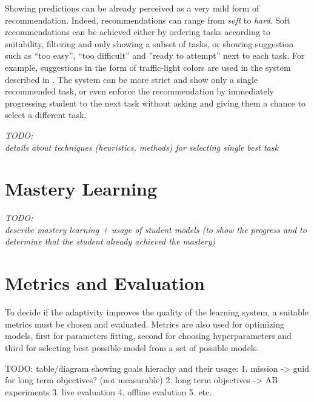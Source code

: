 Showing predictions can be already perceived as a very mild form of recommendation.
Indeed, recommendations can range from \emph{soft} to \emph{hard}.
Soft recommendations can be achieved either by
  ordering tasks according to suitability,
  filtering and only showing a subset of tasks,
  or showing suggestion such as
  ``too easy'', ``too difficult'' and ''ready to attempt'' next to each task.
For example, suggestions in the form of traffic-light colors
  are used in the system described in \cite{its-programming}.
The system can be more strict and show only a single recommended task,
  or even enforce the recommendation by immediately progressing student to
  the next task without asking and giving them a chance to select a different task.

\bigskip
\emph{TODO:\\details about techniques (heuristics, methods) for selecting single best task}


\section{Mastery Learning}
\label{sec:mastery-learning}

\emph{TODO:\\describe mastery learning + usage of student models%
(to show the progress and to determine that the student already achieved the mastery)}



\section{Metrics and Evaluation}
\label{sec:metrics-and-evaluation}


To decide if the adaptivity improves the quality of the learning system,
  a suitable metrics must be chosen and evaluated.
Metrics are also used for optimizing models,
  first for parameters fitting, second for choosing hyperparameters
  and third for selecting best possible model from a set of possible models.

TODO: table/diagram showing goals hierachy and their usage:
1. mission -> guid for long term objectives? (not measurable)
2. long term objectives -> AB experiments
3. live evaluation
4. offline evalution
5. etc.


